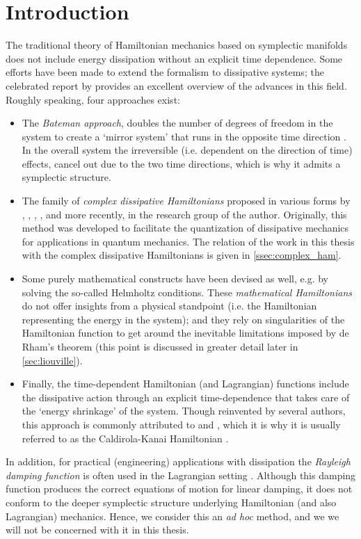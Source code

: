 \section{Introduction}
\label{sec:contact_intro}
The traditional theory of Hamiltonian mechanics based on symplectic manifolds does not include energy dissipation without an explicit time dependence. Some efforts have been made to extend the formalism to dissipative systems; the celebrated report by \citet{Dekker1981} provides an excellent overview of the advances in this field. Roughly speaking, four approaches exist:
\begin{itemize}
    \item The \emph{Bateman approach}, doubles the number of degrees of freedom in the system to create a `mirror system' that runs in the opposite time direction \cite{Bateman1931}. In the overall system the irreversible (i.e. dependent on the direction of time) effects, cancel out due to the two time directions, which is why it admits a symplectic structure.
    \item The family of \emph{complex dissipative Hamiltonians} proposed in various forms by \citet{Bopp1974}, \citet{Dekker1975}, \citet{Dedene1980}, \citet{Rajeev2007}, and more recently, \citet{Hutters2020} in the research group of the author. Originally, this method was developed to facilitate the quantization of dissipative mechanics for applications in quantum mechanics. The relation of the work in this thesis with the complex dissipative Hamiltonians is given in \cref{ssec:complex_ham}.
    \item Some purely mathematical constructs have been devised as well, e.g. by \citet{Havas1957} solving the so-called Helmholtz conditions. These \emph{mathematical Hamiltonians} do not offer insights from a physical standpoint (i.e. the Hamiltonian representing the energy in the system); and they rely on singularities of the Hamiltonian function to get around the inevitable limitations imposed by de Rham's theorem (this point is discussed in greater detail later in \cref{sec:liouville}).
    \item Finally, the time-dependent Hamiltonian (and Lagrangian) functions include the dissipative action through an explicit time-dependence that takes care of the `energy shrinkage' of the system. Though reinvented by several authors, this approach is commonly attributed to \citet{Caldirola1941} and \citet{Kanai1948}, which it is why it is usually referred to as the Caldirola-Kanai Hamiltonian \cite{Schuch1997,Tokieda2021}.
\end{itemize}
In addition, for practical (engineering) applications with dissipation the \emph{Rayleigh damping function} is often used in the Lagrangian setting \cite{Goldstein2011}. Although this damping function produces the correct equations of motion for linear damping, it does not conform to the deeper symplectic structure underlying Hamiltonian (and also Lagrangian) mechanics. Hence, we consider this an \emph{ad hoc} method, and we we will not be concerned with it in this thesis.

